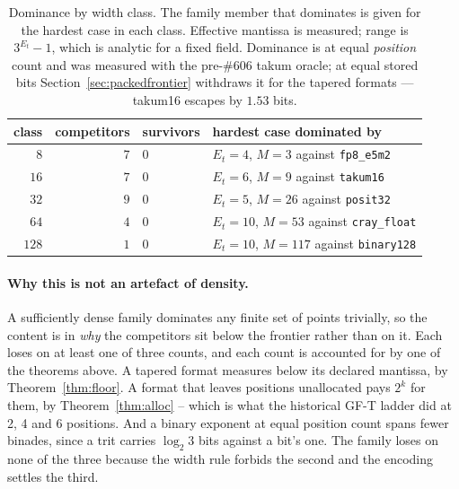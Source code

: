 \begin{table}[t]\centering
\caption{Dominance by width class. The family member that dominates is given for
the hardest case in each class. Effective mantissa is measured; range is
$3^{E_t}-1$, which is analytic for a fixed field. Dominance is at equal
\emph{position} count and was measured with the pre-\#606 takum oracle; at
equal stored bits Section~\ref{sec:packedfrontier} withdraws it for the
tapered formats --- takum16 escapes by $1.53$ bits.}
\label{tab:nosurvivors}
\begin{tabular}{rrll}
\toprule
class & competitors & survivors & hardest case dominated by \\
\midrule
$8$   & $7$ & $0$ & $E_t{=}4$, $M{=}3$ against \texttt{fp8\_e5m2} \\
$16$  & $7$ & $0$ & $E_t{=}6$, $M{=}9$ against \texttt{takum16} \\
$32$  & $9$ & $0$ & $E_t{=}5$, $M{=}26$ against \texttt{posit32} \\
$64$  & $4$ & $0$ & $E_t{=}10$, $M{=}53$ against \texttt{cray\_float} \\
$128$ & $1$ & $0$ & $E_t{=}10$, $M{=}117$ against \texttt{binary128} \\
\bottomrule
\end{tabular}
\end{table}

\paragraph{Why this is not an artefact of density.} A sufficiently dense family
dominates any finite set of points trivially, so the content is in \emph{why} the
competitors sit below the frontier rather than on it. Each loses on at least one
of three counts, and each count is accounted for by one of the theorems above. A tapered format
measures below its declared mantissa, by Theorem~\ref{thm:floor}. A format that
leaves positions unallocated pays $2^k$ for them, by Theorem~\ref{thm:alloc} --
which is what the historical GF-T ladder did at 2, 4 and 6 positions. And a binary
exponent at equal position count spans fewer binades, since a trit carries
$\log_2 3$ bits against a bit's one. The family loses on none of the three because
the width rule forbids the second and the encoding settles the third.

